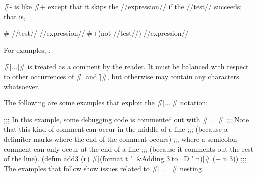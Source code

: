 


\f{\#-} is like \f{\#+} 
except that it skips the //expression// if the //test// succeeds; 
that is,

\code
#-//test// //expression// \EQ #+(not //test//) //expression//
\endcode

For examples, \seesection\FeatureExpExamples.

\endsubsubsection%




\f{\#|...|\#} is treated as a comment by the reader.
It must be balanced with respect to other occurrences of \f{\#|} and \f{|\#},
but otherwise may contain any characters whatsoever.


The following are some examples that exploit the \f{\#|...|\#} notation:

\code
;;; In this example, some debugging code is commented out with #|...|#
;;; Note that this kind of comment can occur in the middle of a line
;;; (because a delimiter marks where the end of the comment occurs)
;;; where a semicolon comment can only occur at the end of a line 
;;; (because it comments out the rest of the line).
 (defun add3 (n) #|(format t "~&Adding 3 to ~D." n)|# (+ n 3))
\goodbreak
;;; The examples that follow show issues related to #| ... |# nesting.

